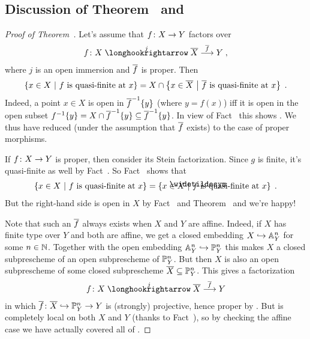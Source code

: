 \documentclass[a4paper,parskip=half,numbers=enddot, DIV=12]{scrreprt}
\begin{document}
\subsection[Discussion of Theorem~\getrefnumber{thm:ZariskiMain}\itememph{b} and \itememph{c}]{Discussion of Theorem~ and }%
\label{proof:discussionOfThm3}
\begin{proof}[Proof of Theorem~]
	Let's assume that $f\colon X\morphism Y$ factors over
	\begin{align}\lbl{eq:properCompactification}
		f\colon X\monomorphism[j]\ov{X}\morphism[\smash{\ov{f}}]Y\;,
	\end{align}
	where $j$ is an open immersion and $\overline{f}$ is proper. Then
	\begin{align}\lbl{eq:fandfbar}
		\left\{x\in X\st f\text{ is quasi-finite at }x\right\}=X\cap \left\{x\in \ov{X}\st \ov{f}\text{ is quasi-finite at }x\right\}\;.
	\end{align}
	Indeed, a point $x\in X$ is open in $\overline{f}^{-1}\{y\}$ (where $y=f(x)$) iff it is open in the open subset $f^{-1}\{y\}=X\cap \overline{f}^{-1}\{y\}\subseteq \overline{f}^{-1}\{y\}$. In view of Fact~ this shows . We thus have reduced  (under the assumption that $\overline{f}$ exists) to the case of proper morphisms. 
	
	If $f\colon X\morphism Y$ is proper, then consider its Stein factorization. Since $g$ is finite, it's quasi-finite as well by Fact~. So Fact~ shows that
	\begin{align*}
		\left\{x\in X\st f\text{ is quasi-finite at }x\right\}=\left\{x\in X\st \snake{f}\text{ is quasi-finite at }x\right\}\;.
	\end{align*}
	But the right-hand side is open in $X$ by Fact~ and Theorem~ and we're happy!
	
	Note that such an $\overline{f}$ always exists when $X$ and $Y$ are affine. Indeed, if $X$ has finite type over $Y$ and both are affine, we get a closed embedding $X\monomorphism\IA_Y^n$ for some $n\in \mathbb{N}$. Together with the open embedding $\IA_Y^n\monomorphism\IP_Y^n$ this makes $X$ a closed subprescheme of an open subprescheme of $\mathbb{P}_Y^n$. But then $X$ is also an open subprescheme of some closed subprescheme $\overline{X}\subseteq \mathbb{P}_Y^n$. This gives a factorization
	\begin{align*}
		f\colon X\monomorphism[j]\ov{X}\morphism[\smash{\ov{f}}]Y
	\end{align*}
	in which $\ov{f}\colon \ov{X}\monomorphism \IP_Y^n\morphism Y$ is (strongly) projective, hence proper by \cite[Proposition~2.4.2]{alggeo2}. But  is completely local on both $X$ and $Y$ (thanks to Fact~), so by checking the affine case we have actually covered all of . 
\end{proof}
\end{document}
